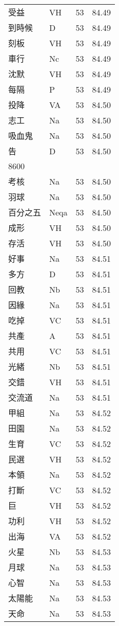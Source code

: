 \documentclass[twocolumn]{book}
\begin{document}
\begin{supertabular}{llrr}
受益 & VH & 53 &  84.49\\
到時候 & D & 53 &  84.49\\
刻板 & VH & 53 &  84.49\\
車行 & Nc & 53 &  84.49\\
沈默 & VH & 53 &  84.49\\
每隔 & P & 53 &  84.49\\
投降 & VA & 53 &  84.50\\
志工 & Na & 53 &  84.50\\
吸血鬼 & Na & 53 &  84.50\\
告 & D & 53 &  84.50\\
8600\\
考核 & Na & 53 &  84.50\\
羽球 & Na & 53 &  84.50\\
百分之五 & Neqa & 53 &  84.50\\
成形 & VH & 53 &  84.50\\
存活 & VH & 53 &  84.50\\
好事 & Na & 53 &  84.51\\
多方 & D & 53 &  84.51\\
回教 & Nb & 53 &  84.51\\
因緣 & Na & 53 &  84.51\\
吃掉 & VC & 53 &  84.51\\
共產 & A & 53 &  84.51\\
共用 & VC & 53 &  84.51\\
光緒 & Nb & 53 &  84.51\\
交錯 & VH & 53 &  84.51\\
交流道 & Na & 53 &  84.51\\
甲組 & Na & 53 &  84.52\\
田園 & Na & 53 &  84.52\\
生育 & VC & 53 &  84.52\\
民選 & VH & 53 &  84.52\\
本領 & Na & 53 &  84.52\\
打斷 & VC & 53 &  84.52\\
巨 & VH & 53 &  84.52\\
功利 & VH & 53 &  84.52\\
出海 & VA & 53 &  84.52\\
火星 & Nb & 53 &  84.53\\
月球 & Na & 53 &  84.53\\
心智 & Na & 53 &  84.53\\
太陽能 & Na & 53 &  84.53\\
天命 & Na & 53 &  84.53\\

\end{supertabular}
\end{document}
